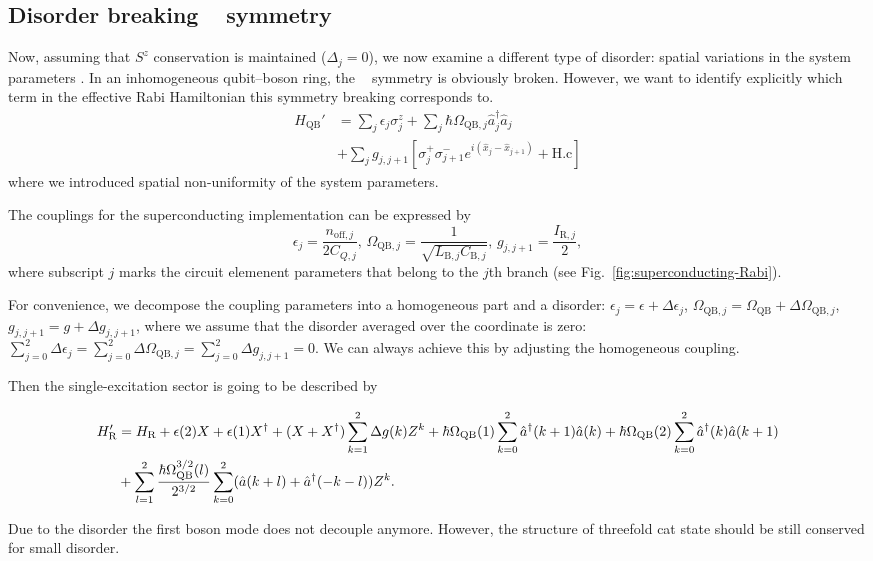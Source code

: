 \documentclass[reprint, aps, prx, amsmath, amssymb, longbibliography, superscriptaddress]{revtex4-2}
\DeclareMathOperator{\Zthree}{\mathbb{Z}_3}
\begin{document}
\subsection{Disorder breaking \texorpdfstring{$\Zthree$}{Z3} symmetry}

Now, assuming that $S^z$ conservation is maintained ($\Delta_j=0$), we now examine a different type of disorder: spatial variations in the system parameters . In an inhomogeneous qubit–boson ring, the $\Zthree$ symmetry is obviously broken. However, we want to identify explicitly which term in the effective Rabi Hamiltonian this symmetry breaking corresponds to.
\begin{equation}
\label{eq:rabi-breaking-disorder}
\begin{aligned}
  H_{\text{QB}}' &= \sum_j \epsilon_{j} \sigma_j^z + \sum_j \hbar \Omega_{\text{QB},j} \hat a^{\dagger}_j \hat a_j  \\
  &+ \sum_j g_{j,j+1} \left[\sigma_j^+ \sigma_{j+1}^- e^{i (\hat x_j - \hat x_{j+1})} +\text{H.c}\right]
\end{aligned}
\end{equation}
where we introduced spatial non-uniformity of the system parameters. 

\vspace{2cm}

The couplings for the superconducting implementation can be expressed by
\begin{equation}
    \epsilon_j = \frac{n_{\mathrm{off},j}}{2 C_{Q,j}}, \,\Omega_{\text{QB},j} = \frac{1}{\sqrt{L_{\text{B},j}C_{\text{B},j}}}, \, g_{j,j+1} = \frac{I_{\text{R},j}}{2},
\end{equation}
where subscript $j$ marks the circuit elemenent parameters that belong to the $j$th branch (see Fig.~\ref{fig:superconducting-Rabi}).

For convenience, we decompose the coupling parameters into a homogeneous part and a disorder: $\epsilon_j = \epsilon + \Delta \epsilon_j$, $\Omega_{\text{QB},j} = \Omega_{\text{QB}} + \Delta \Omega_{\text{QB},j}$, $g_{j,j+1} = g + \Delta g_{j,j+1}$, where we assume that the disorder averaged over the coordinate is zero: $\sum_{j=0}^2 \Delta \epsilon_j =  \sum_{j=0}^2 \Delta \Omega_{\text{QB},j} = \sum_{j=0}^2 \Delta g_{j,j+1} =0$. We can always achieve this by adjusting the homogeneous coupling.

Then the single-excitation sector is going to be described by
\begin{widetext}
\begin{align}
    H_{\text{R}}' &= H_{\text{R}} + \epsilon(2) X 
    +\epsilon(1)  X^{\dagger} + (X + X^{\dagger}) \sum\limits_{k=1}^2 \Delta g(k) Z^k
    + \hbar \Omega_{\text{QB}}(1) \sum\limits_{k=0}^2 \hat a^{\dagger}(k+1) \hat a(k) + \hbar \Omega_{\text{QB}}(2) \sum\limits_{k=0}^2 \hat a^{\dagger}(k) \hat a(k+1) \notag\\
    &+ \sum\limits_{l=1}^2 \frac{\hbar \Omega_{\text{QB}}^{3/2}(l)}{2^{3/2}} \sum\limits_{k=0}^2 (\hat a(k+l) + \hat a^{\dagger}(-k-l)) Z^k.
\end{align}
\end{widetext}

Due to the disorder the first boson mode does not decouple anymore. However, the structure of threefold cat state should be still conserved for small disorder. 




\end{document}

